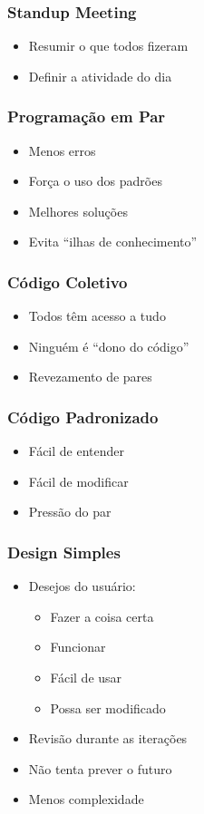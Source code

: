 \documentclass[10pt]{beamer}
\begin{document}
\begin{frame}
  \frametitle{Standup Meeting}
  \begin{itemize}
  \item Resumir o que todos fizeram
  \item Definir a atividade do dia
  \end{itemize}
\end{frame}

\begin{frame}
  \frametitle{Programação em Par}
  \begin{itemize}
  \item Menos erros
  \item Força o uso dos padrões
  \item Melhores soluções
  \item Evita ``ilhas de conhecimento''
  \end{itemize}
\end{frame}

\begin{frame}
  \frametitle{Código Coletivo}
  \begin{itemize}
  \item Todos têm acesso a tudo
  \item Ninguém é ``dono do código''
  \item Revezamento de pares
  \end{itemize}
\end{frame}

\begin{frame}
  \frametitle{Código Padronizado}
  \begin{itemize}
  \item Fácil de entender
  \item Fácil de modificar
  \item Pressão do par
  \end{itemize}
\end{frame}

\begin{frame}
  \frametitle{Design Simples}
  \begin{itemize}
  \item Desejos do usuário:
  \begin{itemize}
    \item Fazer a coisa certa
    \item Funcionar
    \item Fácil de usar
    \item Possa ser modificado
  \end{itemize}
  \item Revisão durante as iterações
  \item Não tenta prever o futuro
  \item Menos complexidade
  \end{itemize}
\end{frame}
\end{document}
